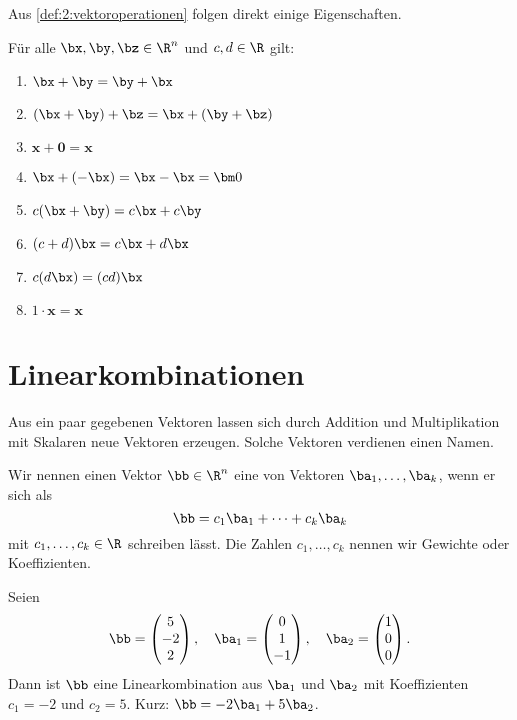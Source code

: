 Aus \cref{def:2:vektoroperationen} folgen direkt einige Eigenschaften.
\begin{theorem} \label{thm:2:vektoroperationen}
	Für alle $\bx, \by, \bz \in \R^n$ und $c, d \in \R$ gilt:
	\begin{enumerate}
		\item $\bx + \by = \by + \bx$
		\item $(\bx + \by) + \bz = \bx + (\by + \bz)$
		\item $\bm x + \bm 0 = \bm x$
		\item $\bx + (-\bx) = \bx - \bx = \bm 0$
		\item $c(\bx + \by) = c\bx  + c\by$
		\item $(c + d)\bx = c\bx + d\bx$
		\item $c(d\bx) = (cd) \bx$
		\item $1 \cdot \bm x = \bm x$
	\end{enumerate}
\end{theorem}


\section{Linearkombinationen}

Aus ein paar gegebenen Vektoren lassen sich durch Addition und Multiplikation mit Skalaren neue Vektoren erzeugen. Solche Vektoren verdienen einen Namen.

\begin{definition} \label{def:2:linearkombination}
	Wir nennen einen Vektor $\bb \in \R^n$ eine  von Vektoren $\ba_1, \dots, \ba_k$, wenn er sich als
	$$\bb = c_1 \ba_1 + \cdots + c_k \ba_k$$
	mit $c_1, \dots, c_k \in \R$ schreiben lässt.
	Die Zahlen $c_1, \dots, c_k$ nennen wir Gewichte oder Koeffizienten.
\end{definition}
\begin{example}
	Seien
	$$\bb = \begin{pmatrix}
			5 \\ -2 \\ 2
		\end{pmatrix}, \quad \ba_1 = \begin{pmatrix}
			0 \\ 1 \\ -1
		\end{pmatrix}, \quad \ba_2 = \begin{pmatrix}
			1 \\ 0 \\ 0
		\end{pmatrix}.$$
	Dann ist $\bb$ eine Linearkombination aus $\ba_1$ und $\ba_2$ mit Koeffizienten $c_1 = -2$ und $c_2 = 5$. Kurz: $\bb = -2 \ba_1 + 5 \ba_2$.
\end{example}



